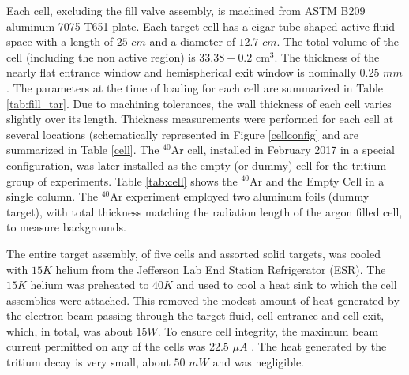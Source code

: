\documentclass[final,5p,times,twocolumn]{elsarticle}
\begin{document}
Each cell, excluding the fill valve assembly, is machined from ASTM B209 aluminum 7075-T651 plate. Each target cell has a cigar-tube shaped active fluid space with a length of $25$ $cm$ and a diameter of $12.7$ $cm$. The total volume of the cell (including the non active region) is $33.38 \pm 0.2$ cm$^{3}$. The thickness of the nearly flat entrance window and hemispherical exit window is nominally $0.25$ $mm$. The parameters at the time of loading for each cell are summarized in Table \ref{tab:fill_tar}. Due to machining tolerances, the wall thickness of each cell varies slightly over its length. Thickness measurements were performed for each cell at several locations (schematically represented in Figure \ref{cellconfig} and are summarized in Table \ref{cell}. The $^{40}$Ar cell, installed in February 2017 in a special configuration, was later installed as the empty (or dummy) cell for the tritium group of experiments. Table \ref{tab:cell} shows the $^{40}$Ar and the Empty Cell in a single column. The $^{40}$Ar experiment employed two aluminum foils (dummy target), with total thickness matching the radiation length of the argon filled cell, to measure backgrounds.

The entire target assembly, of five cells and assorted solid targets, was cooled with $15K$ helium from the Jefferson Lab End Station Refrigerator (ESR). The $15K$ helium was preheated to $40K$ and used to cool a heat sink to which the cell assemblies were attached. This removed the modest amount of heat generated by the electron beam passing through the target fluid, cell entrance and cell exit, which, in total, was about $15W$. To ensure cell integrity, the maximum beam current permitted on any of the cells was $22.5$ $\mu A$ \cite{engreport}. The heat generated by the tritium decay is very small, about $50$ $mW$ and was negligible.

\end{document}
